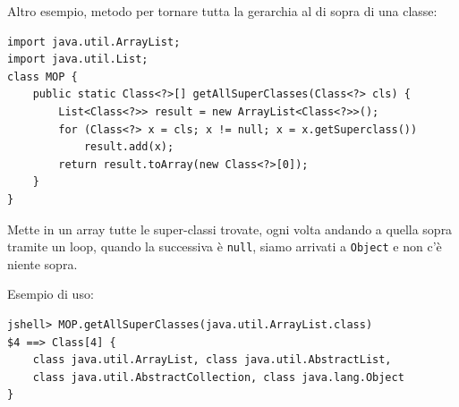 Altro esempio, metodo per tornare tutta la gerarchia al di sopra di una classe:
\begin{verbatim}
import java.util.ArrayList;
import java.util.List;
class MOP {
    public static Class<?>[] getAllSuperClasses(Class<?> cls) {
        List<Class<?>> result = new ArrayList<Class<?>>();
        for (Class<?> x = cls; x != null; x = x.getSuperclass())
            result.add(x);
        return result.toArray(new Class<?>[0]);
    }
}
\end{verbatim}
Mette in un array tutte le super-classi trovate, ogni volta andando a quella sopra tramite un loop, quando la successiva è \texttt{null}, siamo arrivati a \texttt{Object} e non c'è niente sopra.

Esempio di uso:
\begin{verbatim}
jshell> MOP.getAllSuperClasses(java.util.ArrayList.class)
$4 ==> Class[4] {
    class java.util.ArrayList, class java.util.AbstractList,
    class java.util.AbstractCollection, class java.lang.Object
}
\end{verbatim}

